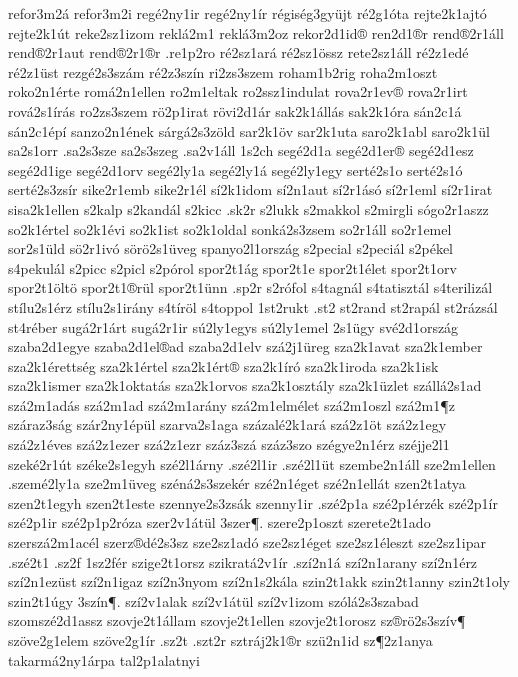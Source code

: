 {refor3m2á %
refor3m2i %
regé2ny1ir
regé2ny1ír
régiség3gyüjt
ré2g1óta
rejte2k1ajtó
rejte2k1út
reke2sz1izom
reklá2m1
reklá3m2oz
rekor2d1id®
ren2d1®r
rend®2r1áll
rend®2r1aut
rend®2r1®r
.re1p2ro
ré2sz1ará
ré2sz1össz
rete2sz1áll
ré2z1edé
ré2z1üst
rezgé2s3szám
ré2z3szín
ri2zs3szem
roham1b2rig
roha2m1oszt
roko2n1érte
romá2n1ellen
ro2m1eltak
ro2ssz1indulat
rova2r1ev®
rova2r1irt
rová2s1írás
ro2zs3szem
rö2p1irat
rövi2d1ár
sak2k1állás
sak2k1óra
sán2c1á
sán2c1épí
sanzo2n1ének
sárgá2s3zöld
sar2k1öv
sar2k1uta
saro2k1abl
saro2k1ül
sa2s1orr
.sa2s3sze
sa2s3szeg
.sa2v1áll
1s2ch		%
segé2d1a
segé2d1er®
segé2d1esz
segé2d1ige
segé2d1orv
segé2ly1a
segé2ly1á
segé2ly1egy
serté2s1o
serté2s1ó
serté2s3zsír
sike2r1emb
sike2r1él
sí2k1idom
sí2n1aut
sí2r1ásó
sí2r1eml
sí2r1irat
sisa2k1ellen
s2kalp
s2kandál
s2kicc
.sk2r
s2lukk
s2makkol
s2mirgli
sógo2r1aszz
so2k1értel
so2k1évi
so2k1ist
so2k1oldal
sonká2s3zsem
so2r1áll
so2r1emel
sor2s1üld
sö2r1ivó
sörö2s1üveg
spanyo2l1ország
s2pecial
s2peciál
s2pékel
s4pekulál
s2picc
s2picl
s2pórol
spor2t1ág
spor2t1e
spor2t1élet
spor2t1orv
spor2t1öltö
spor2t1®rül
spor2t1ünn
.sp2r
s2rófol
s4tagnál
s4tatisztál
s4terilizál
stílu2s1érz
stílu2s1irány
s4tíröl
s4toppol
1st2rukt %
.st2 %
st2rand
st2rapál
st2rázsál
st4réber
sugá2r1árt
sugá2r1ir
sú2ly1egys
sú2ly1emel
2s1ügy
své2d1ország
szaba2d1egye
szaba2d1el®ad
szaba2d1elv
szá2j1üreg
sza2k1avat
sza2k1ember
sza2k1érettség
sza2k1értel
sza2k1ért®
sza2k1író
sza2k1iroda
sza2k1isk
sza2k1ismer
sza2k1oktatás
sza2k1orvos
sza2k1osztály
sza2k1üzlet
szállá2s1ad
szá2m1adás
szá2m1ad
szá2m1arány
szá2m1elmélet
szá2m1oszl
szá2m1¶z
száraz3ság
szár2ny1épül
szarva2s1aga
százalé2k1ará
szá2z1öt
szá2z1egy
szá2z1éves
szá2z1ezer
szá2z1ezr
száz3szá
száz3szo
szégye2n1érz
széjje2l1
szeké2r1út
széke2s1egyh
szé2l1árny
.szé2l1ir
.szé2l1üt
szembe2n1áll
sze2m1ellen
.szemé2ly1a
sze2m1üveg
széná2s3szekér
szé2n1éget
szé2n1ellát
szen2t1atya
szen2t1egyh
szen2t1este
szennye2s3zsák
szenny1ir
.szé2p1a
szé2p1érzék
szé2p1ír
szé2p1ir
szé2p1p2róza
szer2v1átül
3szer¶.
szere2p1oszt
szerete2t1ado
szerszá2m1acél
szerz®dé2s3sz
sze2sz1adó
sze2sz1éget
sze2sz1éleszt
sze2sz1ipar
.szé2t1
.sz2f
1sz2fér
szige2t1orsz
szikratá2v1ír
.szí2n1á
szí2n1arany
szí2n1érz
szí2n1ezüst
szí2n1igaz
szí2n3nyom
szí2n1s2kála
szin2t1akk
szin2t1anny
szin2t1oly
szin2t1úgy
3szín¶.
szí2v1alak
szí2v1átül
szí2v1izom
szólá2s3szabad
szomszé2d1assz
szovje2t1állam
szovje2t1ellen
szovje2t1orosz
sz®rö2s3szív¶
szöve2g1elem
szöve2g1ír
.sz2t
.szt2r
sztráj2k1®r
szü2n1id
sz¶2z1anya
takarmá2ny1árpa
tal2p1alatnyi
}

